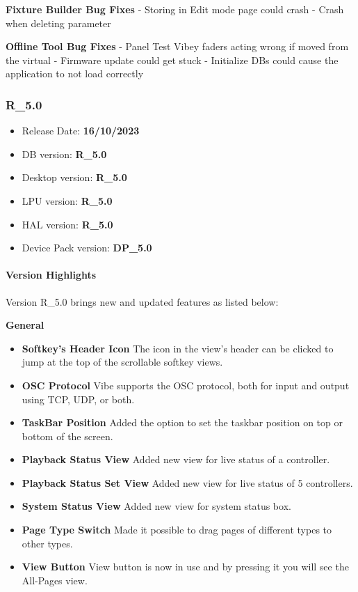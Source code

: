 \documentclass[
]{article}
\providecommand{\tightlist}{%
  \setlength{\itemsep}{0pt}\setlength{\parskip}{0pt}}
\begin{document}
\textbf{Fixture Builder Bug Fixes}
- Storing in Edit mode page could crash
- Crash when deleting parameter

\textbf{Offline Tool Bug Fixes}
- Panel Test Vibey faders acting wrong if moved from the virtual
- Firmware update could get stuck
- Initialize DBs could cause the application to not load correctly

\hypertarget{r_5.0}{%
\subsubsection{R\_5.0}\label{r_5.0}}

\begin{itemize}
\tightlist
\item
  Release Date: \textbf{16/10/2023}
\item
  DB version: \textbf{R\_5.0}
\item
  Desktop version: \textbf{R\_5.0}
\item
  LPU version: \textbf{R\_5.0}
\item
  HAL version: \textbf{R\_5.0}
\item
  Device Pack version: \textbf{DP\_5.0}
\end{itemize}

\hypertarget{version-highlights-2}{%
\paragraph{Version Highlights}\label{version-highlights-2}}

Version R\_5.0 brings new and updated features as listed below:

\textbf{General}

\begin{itemize}
\item
  \textbf{Softkey's Header Icon} The icon in the view's header can be clicked to jump at the top of the scrollable softkey views.
\item
  \textbf{OSC Protocol} Vibe supports the OSC protocol, both for input and output using TCP, UDP, or both.
\item
  \textbf{TaskBar Position} Added the option to set the taskbar position on top or bottom of the screen.
\item
  \textbf{Playback Status View} Added new view for live status of a controller.
\item
  \textbf{Playback Status Set View} Added new view for live status of 5 controllers.
\item
  \textbf{System Status View} Added new view for system status box.
\item
  \textbf{Page Type Switch} Made it possible to drag pages of different types to other types.
\item
  \textbf{View Button} View button is now in use and by pressing it you will see the All-Pages view.
\end{itemize}
\end{document}
